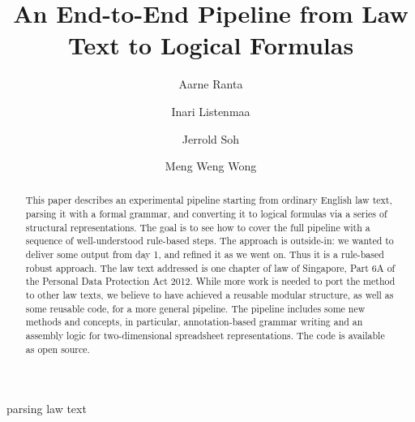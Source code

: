 \documentclass{IOS-Book-Article}
\def\hb{\hbox to 11.5 cm{}}
\begin{document}
\pagestyle{headings}
\def\thepage{}
\begin{frontmatter}              %

\title{An End-to-End Pipeline from Law Text to Logical Formulas}

\markboth{}{August 2022\hb}

\author[A]{Aarne Ranta}
\author[C]{Inari Listenmaa}
\author[C]{Jerrold Soh}
\author[C]{Meng Weng Wong}

\address[A]{
  Department of Computer Science and Engineering,
  Chalmers University of Technology and University of Gothenburg,
  aarne.ranta@cse.gu.se
  }
\address[B]{SMU and Digital Grammars}
\address[C]{Yong Pung How School of Law, Singapore Management University}

\begin{abstract}
This paper describes an experimental pipeline starting from ordinary English law text, parsing it with a formal grammar, and converting it to logical formulas via a series of structural representations.
The goal is to see how to cover the full pipeline with a sequence of well-understood rule-based steps.
The approach is outside-in: we wanted to deliver some output from day 1, and refined it as we went on.
Thus it is a rule-based robust approach.
The law text addressed is one chapter of law of Singapore, Part 6A of the Personal Data Protection Act 2012.
While more work is needed to port the method to other law texts, we believe to have achieved a reusable modular structure, as well as some reusable code, for a more general pipeline.
The pipeline includes some new methods and concepts, in particular, annotation-based grammar writing and an assembly logic for two-dimensional spreadsheet representations.
The code is available as open source.
\end{abstract}


\begin{keyword}
parsing law text
\end{keyword}
\end{frontmatter}
\markboth{August 2022\hb}{August 2022\hb}

\end{document}
